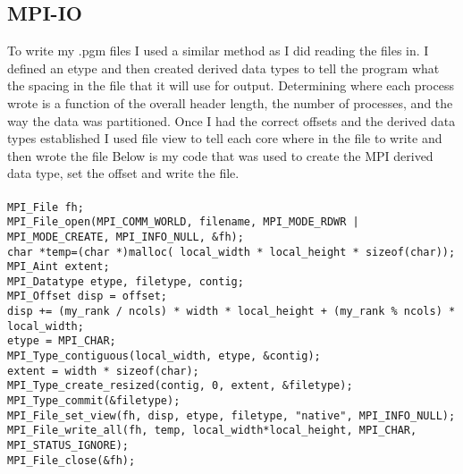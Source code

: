\documentclass[11pt,a4paper,oneside]{report}
\begin{document}
\subsection{MPI-IO}
To write my .pgm files I used a similar method as I did reading the files in.  
I defined an etype and then created derived data types to tell the program what the spacing in the file that it will use for output.
Determining where each process wrote is a function of the overall header length, the number of processes, and the way the data was partitioned.
Once I had the correct offsets and the derived data types established I used file view to tell each core where in the file to write and then wrote the file
Below is my code that was used to create the MPI derived data type, set the offset and write the file.
\\\\
\noindent\texttt{MPI\_File fh;                                          } \\
\texttt{MPI\_File\_open(MPI\_COMM\_WORLD, filename, MPI\_MODE\_RDWR | MPI\_MODE\_CREATE, MPI\_INFO\_NULL, \&fh);}\\
\texttt{char *temp=(char *)malloc( local\_width * local\_height * sizeof(char));}\\
\texttt{MPI\_Aint extent;                                      }\\
\texttt{MPI\_Datatype etype, filetype, contig;                 }\\
\texttt{MPI\_Offset disp = offset;                             }\\
\texttt{disp += (my\_rank / ncols) * width * local\_height + (my\_rank \% ncols) * local\_width;}\\
\texttt{etype = MPI\_CHAR;                                     }\\
\texttt{MPI\_Type\_contiguous(local\_width, etype, \&contig);  }\\
\texttt{extent = width * sizeof(char);                         }\\
\texttt{MPI\_Type\_create\_resized(contig, 0, extent, \&filetype);}\\
\texttt{MPI\_Type\_commit(\&filetype);                         }\\
\texttt{MPI\_File\_set\_view(fh, disp, etype, filetype, "native", MPI\_INFO\_NULL);}\\
\texttt{MPI\_File\_write\_all(fh, temp, local\_width*local\_height, MPI\_CHAR, MPI\_STATUS\_IGNORE);}\\
\texttt{MPI\_File\_close(\&fh);}
\\\\
\end{document}
